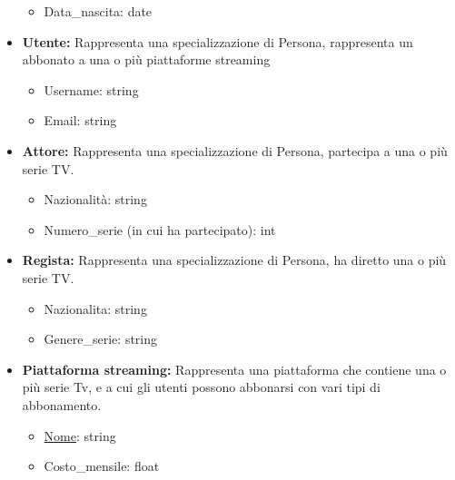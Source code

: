 \documentclass[10pt,a4paper]{article}
\begin{document}
\begin{itemize}
\begin{itemize}
        \item Data\_nascita: date
    \end{itemize}
    \item \textbf{Utente:} Rappresenta una specializzazione di Persona, rappresenta un abbonato a una o più piattaforme streaming
    \begin{itemize}
        \item Username: string
        \item Email: string
    \end{itemize}
    \item \textbf{Attore:} Rappresenta una specializzazione di Persona, partecipa a una o più serie TV.
    \begin{itemize}
        \item Nazionalità: string
        \item Numero\_serie (in cui ha partecipato): int
    \end{itemize}
    \item \textbf{Regista:} Rappresenta una specializzazione di Persona, ha diretto una o più serie TV.
    \begin{itemize}
        \item Nazionalita: string
        \item Genere\_serie: string
    \end{itemize}
    \item \textbf{Piattaforma streaming:} Rappresenta una piattaforma che contiene una o più serie Tv, e a cui gli utenti possono abbonarsi con vari tipi di abbonamento.
    \begin{itemize}
        \item \underline{Nome}: string
        \item Costo\_mensile: float
    \end{itemize}
\end{itemize}
\end{document}
